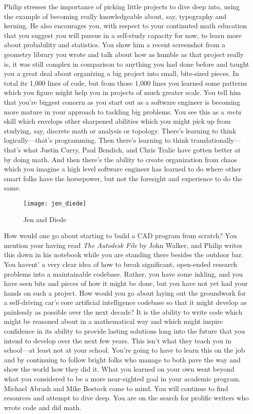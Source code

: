\documentclass[../main.tex]{subfiles}
\begin{document}
Philip stresses the importance of picking little projects to dive deep into, using the example of becoming really knowledgeable about, say, typography and kerning. He also encourages you, with respect to your continuted math education that you suggest you will pursue in a self-study capacity for now, to learn more about probability and statistics. You show him a recent screenshot from a geometry library you wrote and talk about how as humble as that project really is, it was still complex in comparison to anything you had done before and taught you a great deal about organizing a big project into small, bite-sized pieces. In total its 1,000 lines of code, but from those 1,000 lines you learned some patterns which you figure might help you in projects of much greater scale. You tell him that you're biggest concern as you start out as a software engineer is becoming more mature in your approach to tackling big problems. You see this as a \textit{meta} skill which envelops other sharpened abilities which you might pick up from studying, say, discrete math or analysis or topology. There's learning to think logically---that's programming. Then there's learning to think translationally---that's what Justin Curry, Paul Bendich, and Chris Tralie have gotten better at by doing math. And then there's the ability to create organization from chaos which you imagine a high level software engineer has learned to do where other smart folks have the horsepower, but not the foresight and experience to do the same.

\begin{figure}[h!]
	\centering
	\texttt{[image: jen\_diede]}
	\caption*{Jen and Diede}
\end{figure}

How would one go about starting to build a CAD program from scratch? You mention your having read \textit{The Autodesk File} by John Walker, and Philip writes this down in his notebook while you are standing there besides the outdoor bar. You havent' a very clear idea of how to break significant, open-ended research problems into a maintainable codebase. Rather, you have some inkling, and you have seen bits and pieces of how it might be done, but you have not yet had your hands on such a project. How would you go about laying out the groundwork for a self-driving car's core artificial intelligence codebase so that it might develop as painlessly as possible over the next decade? It is the ability to write code which might be reasoned about in a mathematical way and which might inspire confidence in its ability to provide lasting solutions long into the future that you intend to develop over the next few years. This isn't what they teach you in school---at least not at your school. You're going to have to learn this on the job and by continuing to follow bright folks who manage to both pave the way and show the world how they did it. What you learned on your own went beyond what you considered to be a more near-sighted goal in your academic program. Michael Abrash and Mike Bostock come to mind. You will continue to find resources and attempt to dive deep. You are on the search for prolific writers who wrote code and did math.
\end{document}
